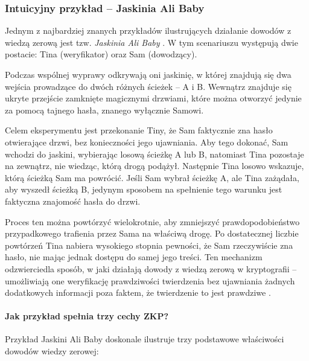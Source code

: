 \documentclass{article}
\begin{document}
\subsubsection{Intuicyjny przykład – Jaskinia Ali Baby}
Jednym z najbardziej znanych przykładów ilustrujących działanie dowodów z wiedzą zerową jest tzw. \textit{Jaskinia Ali Baby} \cite{zkp_101blockchains}. W tym scenariuszu występują dwie postacie: Tina (weryfikator) oraz Sam (dowodzący). 

Podczas wspólnej wyprawy odkrywają oni jaskinię, w której znajdują się dwa wejścia prowadzące do dwóch różnych ścieżek – A i B. 
Wewnątrz znajduje się ukryte przejście zamknięte magicznymi drzwiami, które można otworzyć jedynie za pomocą tajnego hasła, znanego wyłącznie Samowi.

Celem eksperymentu jest przekonanie Tiny, że Sam faktycznie zna hasło otwierające drzwi, bez konieczności jego ujawniania. 
Aby tego dokonać, Sam wchodzi do jaskini, wybierając losową ścieżkę A lub B, natomiast Tina pozostaje na zewnątrz, nie wiedząc, którą drogą podążył. 
Następnie Tina losowo wskazuje, którą ścieżką Sam ma powrócić. Jeśli Sam wybrał ścieżkę A, ale Tina zażądała, aby wyszedł ścieżką B, 
jedynym sposobem na spełnienie tego warunku jest faktyczna znajomość hasła do drzwi. 

Proces ten można powtórzyć wielokrotnie, aby zmniejszyć prawdopodobieństwo przypadkowego trafienia przez Sama na właściwą drogę. 
Po dostatecznej liczbie powtórzeń Tina nabiera wysokiego stopnia pewności, że Sam rzeczywiście zna hasło, nie mając jednak dostępu do samej jego treści. 
Ten mechanizm odzwierciedla sposób, w jaki działają dowody z wiedzą zerową w kryptografii – umożliwiają one 
weryfikację prawdziwości twierdzenia bez ujawniania żadnych dodatkowych informacji poza faktem, że twierdzenie to jest prawdziwe \cite{zkp_101blockchains}.

\paragraph{Jak przykład spełnia trzy cechy ZKP?}
Przykład Jaskini Ali Baby doskonale ilustruje trzy podstawowe właściwości dowodów wiedzy zerowej:
\end{document}

